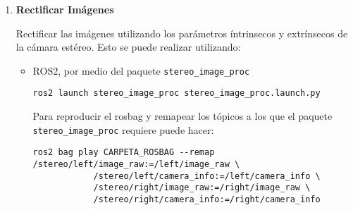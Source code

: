 \documentclass[tp]{lcc}
\begin{document}
\begin{enumerate}
    
    
    \item \textbf{Rectificar Imágenes}
    
    Rectificar las imágenes utilizando los parámetros íntrinsecos y extrínsecos de la cámara estéreo. Esto se puede realizar utilizando:
    
    \begin{itemize}
        \item ROS2, por medio del paquete \lstinline{stereo_image_proc}
        
        \begin{lstlisting}[style=bash]     
            ros2 launch stereo_image_proc stereo_image_proc.launch.py
        \end{lstlisting}
        
        Para reproducir el rosbag y remapear los tópicos a los que el paquete \lstinline{stereo_image_proc} requiere puede hacer:
        \begin{lstlisting}[style=bash]   
            ros2 bag play CARPETA_ROSBAG --remap /stereo/left/image_raw:=/left/image_raw \
            /stereo/left/camera_info:=/left/camera_info \
            /stereo/right/image_raw:=/right/image_raw \
            /stereo/right/camera_info:=/right/camera_info
        \end{lstlisting}
        

\end{itemize}
\end{enumerate}
\end{document}
